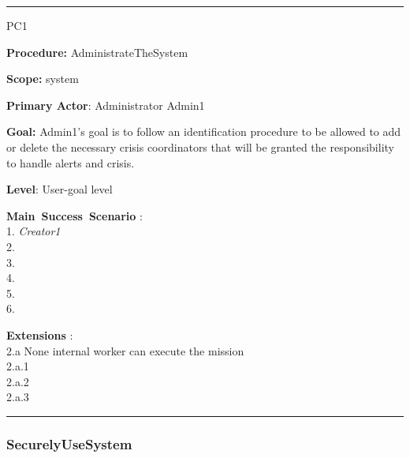 \hrule
\begin{lyxlist}{PC1}
\small{
\item [\textbf{Procedure:}] AdministrateTheSystem
\item [\textbf{Scope:}] system
\item [\textbf{Primary Actor}:] Administrator Admin1
\item [\textbf{Goal:}] Admin1’s goal is to follow an
identification procedure to be allowed to add or delete the necessary crisis
coordinators that will be granted the responsibility to handle alerts and crisis.
\item [\textbf{Level}:] User-goal level
\item [\textbf{Main~Success~Scenario}]:\\
1. \emph{Creator1} \\
2. \\
3. \\
4. \\
5. \\
6.


\item [\textbf{Extensions}]:\\
2.a None internal worker can execute the mission\\
\hspace*{0.5cm} 2.a.1 \\
\hspace*{0.5cm} 2.a.2 \\
\hspace*{0.5cm} 2.a.3 \\

}

\end{lyxlist}
\hrule

\subsubsection{SecurelyUseSystem}

